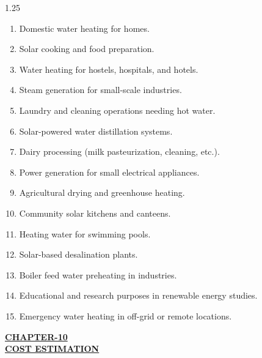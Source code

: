 \documentclass[12pt,a4paper]{article}
\begin{document}
\begin{spacing}{1.25}
{\fontsize{10.5}{14.5}\selectfont
\begin{enumerate}[leftmargin=8mm, itemsep=2.2mm]
  \item Domestic water heating for homes.
  \item Solar cooking and food preparation.
  \item Water heating for hostels, hospitals, and hotels.
  \item Steam generation for small-scale industries.
  \item Laundry and cleaning operations needing hot water.
  \item Solar-powered water distillation systems.
  \item Dairy processing (milk pasteurization, cleaning, etc.).
  \item Power generation for small electrical appliances.
  \item Agricultural drying and greenhouse heating.
  \item Community solar kitchens and canteens.
  \item Heating water for swimming pools.
  \item Solar-based desalination plants.
  \item Boiler feed water preheating in industries.
  \item Educational and research purposes in renewable energy studies.
  \item Emergency water heating in off-grid or remote locations.
\end{enumerate}
}
\end{spacing}
\clearpage




\begin{center}
  {\fontsize{15}{18}\selectfont \bfseries \textcolor{red!80!black}{\underline{CHAPTER-10}}}\\[2mm]
  {\fontsize{16}{20}\selectfont \bfseries \textcolor{red!80!black}{\underline{COST ESTIMATION}}}\\[5mm]
\end{center}
\end{document}
